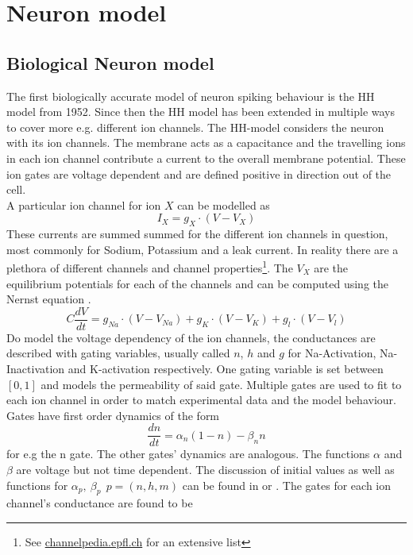 \section{Neuron model}

\subsection{Biological Neuron model}
The first biologically accurate model of neuron spiking behaviour is the \ac{HH} model from 1952\cite{hodgkin_currents_1952}. Since then the \ac{HH} model has been extended in multiple ways to cover more e.g. different ion channels. The \ac{HH}-model considers the neuron with its ion channels. The membrane acts as a capacitance and the travelling ions in each ion channel contribute a current to the overall membrane potential. These ion gates are voltage dependent and are defined positive in direction out of the cell.\\
A particular ion channel for ion $X$ can be modelled as
\begin{equation}
	I_X= g_X \cdot (V-V_X)
\end{equation}
These currents are summed summed for the different ion channels in question, most commonly for Sodium, Potassium and a leak current. In reality there are a plethora of different channels and channel properties\footnote{See  \url{channelpedia.epfl.ch} for an extensive list}. The $V_X$ are the equilibrium potentials for each of the channels and can be computed using the Nernst equation \cite{johnston_foundations_1995}.
\begin{equation}
	C \frac{dV}{dt} = g_{Na} \cdot (V-V_{Na}) + g_K \cdot (V-V_K) + g_l \cdot (V-V_l)
\end{equation}
Do model the voltage dependency of the ion channels, the conductances are described with gating variables, usually called $n$, $h$ and $g$ for Na-Activation, Na-Inactivation and K-activation respectively. One gating variable is set between $[0,1]$ and models the permeability of said gate. Multiple gates are used to fit to each ion channel in order to match experimental data and the model behaviour.\\
Gates have first order dynamics of the form
\begin{equation}
	\frac{dn}{dt} = \alpha_n(1-n) - \beta_n n
\end{equation}
for e.g the n gate. The other gates' dynamics are analogous. The functions $\alpha$ and $\beta$ are voltage but not time dependent. The discussion of initial values as well as functions for $\alpha_p,\ \beta_p\ \ p = (n,h,m)$ can be found in \cite{hodgkin_quantitative_1952} or \cite{johnston_foundations_1995}. The gates for each ion channel's conductance are found to be
